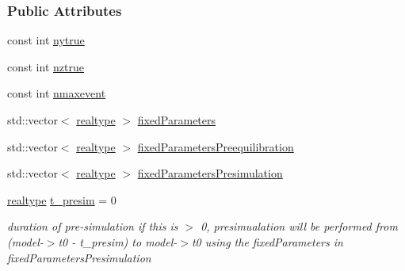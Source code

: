 \subsubsection*{Public Attributes}
\begin{DoxyCompactItemize}
\item 
const int \mbox{\hyperlink{classamici_1_1_exp_data_a54bcfe56ad0df183516d096adf4e0b26}{nytrue}}
\item 
const int \mbox{\hyperlink{classamici_1_1_exp_data_a9a451378ba5572ef7a3fd4dd89e1c227}{nztrue}}
\item 
const int \mbox{\hyperlink{classamici_1_1_exp_data_a48832d4f3a37c4fd75cc7f4ef578d1b1}{nmaxevent}}
\item 
std\+::vector$<$ \mbox{\hyperlink{namespaceamici_a1bdce28051d6a53868f7ccbf5f2c14a3}{realtype}} $>$ \mbox{\hyperlink{classamici_1_1_exp_data_ac1d5115134ec1c839f1e913724ceb2b4}{fixed\+Parameters}}
\item 
std\+::vector$<$ \mbox{\hyperlink{namespaceamici_a1bdce28051d6a53868f7ccbf5f2c14a3}{realtype}} $>$ \mbox{\hyperlink{classamici_1_1_exp_data_acee836e015941b3984c44e1c7423b101}{fixed\+Parameters\+Preequilibration}}
\item 
std\+::vector$<$ \mbox{\hyperlink{namespaceamici_a1bdce28051d6a53868f7ccbf5f2c14a3}{realtype}} $>$ \mbox{\hyperlink{classamici_1_1_exp_data_a86fb66aedc21085f868fb6509a45c92d}{fixed\+Parameters\+Presimulation}}
\item 
\mbox{\label{classamici_1_1_exp_data_acb5fa397f91ea45e9e2890036d339969}} 
\mbox{\hyperlink{namespaceamici_a1bdce28051d6a53868f7ccbf5f2c14a3}{realtype}} \mbox{\hyperlink{classamici_1_1_exp_data_acb5fa397f91ea45e9e2890036d339969}{t\+\_\+presim}} = 0
\begin{DoxyCompactList}\small\item\em duration of pre-\/simulation if this is $>$ 0, presimualation will be performed from (model-\/$>$t0 -\/ t\+\_\+presim) to model-\/$>$t0 using the fixed\+Parameters in fixed\+Parameters\+Presimulation \end{DoxyCompactList}\end{DoxyCompactItemize}
